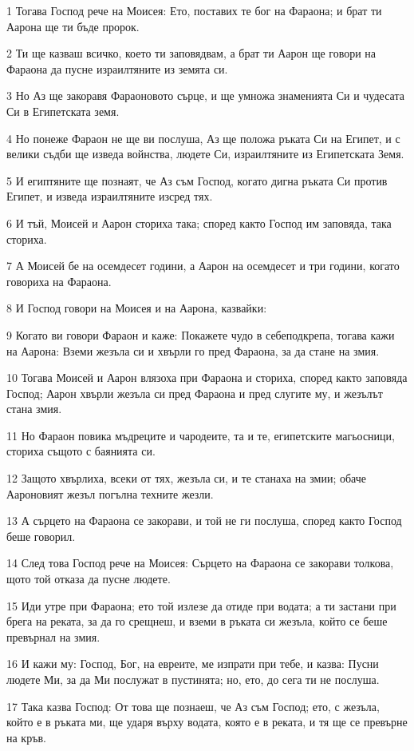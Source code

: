 \par 1 Тогава Господ рече на Моисея: Ето, поставих те бог на Фараона; и брат ти Аарона ще ти бъде пророк.
\par 2 Ти ще казваш всичко, което ти заповядвам, а брат ти Аарон ще говори на Фараона да пусне израилтяните из земята си.
\par 3 Но Аз ще закоравя Фараоновото сърце, и ще умножа знаменията Си и чудесата Си в Египетската земя.
\par 4 Но понеже Фараон не ще ви послуша, Аз ще положа ръката Си на Египет, и с велики съдби ще изведа войнства, людете Си, израилтяните из Египетската Земя.
\par 5 И египтяните ще познаят, че Аз съм Господ, когато дигна ръката Си против Египет, и изведа израилтяните изсред тях.
\par 6 И тъй, Моисей и Аарон сториха така; според както Господ им заповяда, така сториха.
\par 7 А Моисей бе на осемдесет години, а Аарон на осемдесет и три години, когато говориха на Фараона.
\par 8 И Господ говори на Моисея и на Аарона, казвайки:
\par 9 Когато ви говори Фараон и каже: Покажете чудо в себеподкрепа, тогава кажи на Аарона: Вземи жезъла си и хвърли го пред Фараона, за да стане на змия.
\par 10 Тогава Моисей и Аарон влязоха при Фараона и сториха, според както заповяда Господ; Аарон хвърли жезъла си пред Фараона и пред слугите му, и жезълът стана змия.
\par 11 Но Фараон повика мъдреците и чародеите, та и те, египетските магьосници, сториха същото с баянията си.
\par 12 Защото хвърлиха, всеки от тях, жезъла си, и те станаха на змии; обаче Аароновият жезъл погълна техните жезли.
\par 13 А сърцето на Фараона се закорави, и той не ги послуша, според както Господ беше говорил.
\par 14 След това Господ рече на Моисея: Сърцето на Фараона се закорави толкова, щото той отказа да пусне людете.
\par 15 Иди утре при Фараона; ето той излезе да отиде при водата; а ти застани при брега на реката, за да го срещнеш, и вземи в ръката си жезъла, който се беше превърнал на змия.
\par 16 И кажи му: Господ, Бог, на евреите, ме изпрати при тебе, и казва: Пусни людете Ми, за да Ми послужат в пустинята; но, ето, до сега ти не послуша.
\par 17 Така казва Господ: От това ще познаеш, че Аз съм Господ; ето, с жезъла, който е в ръката ми, ще ударя върху водата, която е в реката, и тя ще се превърне на кръв.

